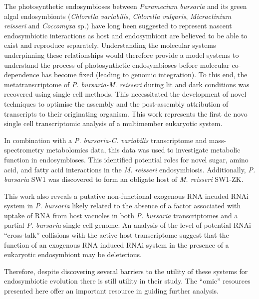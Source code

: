 The photosynthetic endosymbioses between \textit{Paramecium bursaria} and its green algal endosymbionts 
(\textit{Chlorella variabilis}, \textit{Chlorella vulgaris}, \textit{Micractinium reisseri} and \textit{Coccomyxa} sp.) 
have long been suggested to represent nascent endosymbiotic interactions 
as host and endosymbiont are believed to be able to exist and reproduce separately. 
Understanding the molecular systems underpinning these relationships would therefore 
provide a model systems to understand the process of photosynthetic endosymbioses 
before molecular co-dependence has become fixed (leading to genomic integration).
To this end, the metatranscriptome of \textit{P. bursaria-M. reisseri} during 
lit and dark conditions was recovered using single cell methods. 
This necessitated the development of novel techniques to optimise the 
assembly and the post-assembly attribution of transcripts to their originating organism. 
This work represents the first de novo single cell transcriptomic analysis of a multimember eukaryotic system.  


In combination with a \textit{P. bursaria-C. variabilis} transcriptome and 
mass-spectrometry metabolomics data, 
this data was used to investigate metabolic function in endosymbioses. 
This identified potential roles for novel sugar, amino acid, and 
fatty acid interactions in the \textit{M. reisseri} endosymbiosis.
Additionally, \textit{P. bursaria} SW1 was discovered to form an obligate host of
\textit{M. reisseri} SW1-ZK.

 
This work also reveals a putative non-functional exogenous RNA incuded 
RNAi system in \textit{P. bursaria} likely related to the absence of a factor 
associated with uptake of RNA from host vacuoles in both \textit{P. bursaria}
transcriptomes and a partial \textit{P. bursaria} single cell genome.  
An analysis of the level of potential RNAi ``cross-talk'' 
collisions with the active host transcriptome suggest that the function of an 
exogenous RNA induced RNAi system in the presence of a eukaryotic endosymbiont may be deleterious.

 
Therefore, despite discovering several barriers to the utility of these systems for endosymbiotic 
evolution there is still utility in their study. The “omic'' resources presented here 
offer an important resource in guiding further analysis.

